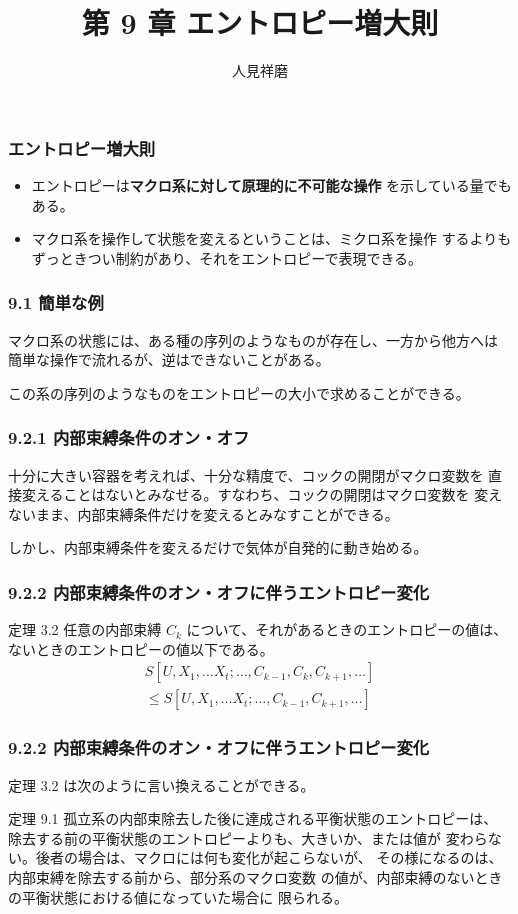 \documentclass[aspectratio=149]{beamer}
\author{人見祥磨}
\title{第 9 章 エントロピー増大則}
\newcommand{\hmemph}[1]{\textbf{#1}}
\begin{document}
\begin{frame}
	\maketitle
\end{frame}

\begin{frame}
	\frametitle{エントロピー増大則}
	\begin{itemize}
		\item エントロピーは\hmemph{マクロ系に対して原理的に不可能な操作}
			を示している量でもある。
		\item マクロ系を操作して状態を変えるということは、ミクロ系を操作
			するよりもずっときつい制約があり、それをエントロピーで表現できる。
	\end{itemize}
\end{frame}

\begin{frame}
	\frametitle{9.1 簡単な例}
	マクロ系の状態には、ある種の序列のようなものが存在し、一方から他方へは
	簡単な操作で流れるが、逆はできないことがある。
	
	この系の序列のようなものをエントロピーの大小で求めることができる。
\end{frame}

\begin{frame}
	\frametitle{9.2.1 内部束縛条件のオン・オフ}
	十分に大きい容器を考えれば、十分な精度で、コックの開閉がマクロ変数を
	直接変えることはないとみなせる。すなわち、コックの開閉はマクロ変数を
	変えないまま、内部束縛条件だけを変えるとみなすことができる。
	
	しかし、内部束縛条件を変えるだけで気体が自発的に動き始める。
\end{frame}

\begin{frame}
	\frametitle{9.2.2 内部束縛条件のオン・オフに伴うエントロピー変化}
	\begin{block}{定理 3.2}
		任意の内部束縛 \(C_k\) について、それがあるときのエントロピーの値は、
		ないときのエントロピーの値以下である。
		\begin{multline}
			S[U,X_1,\dots X_t;\dots,C_{k-1},C_k,C_{k+1},\dotsc]\\
			\leq S[U,X_1,\dots X_t;\dots,C_{k-1},C_{k+1},\dotsc]\tag{3.38}
		\end{multline}
	\end{block}
\end{frame}

\begin{frame}
	\frametitle{9.2.2 内部束縛条件のオン・オフに伴うエントロピー変化}
	定理 3.2 は次のように言い換えることができる。
	\begin{block}{定理 9.1}
		孤立系の内部束除去した後に達成される平衡状態のエントロピーは、
		除去する前の平衡状態のエントロピーよりも、大きいか、または値が
		変わらない。後者の場合は、マクロには何も変化が起こらないが、
		その様になるのは、内部束縛を除去する前から、部分系のマクロ変数
		の値が、内部束縛のないときの平衡状態における値になっていた場合に
		限られる。
	\end{block}
\end{frame}
\end{document}
